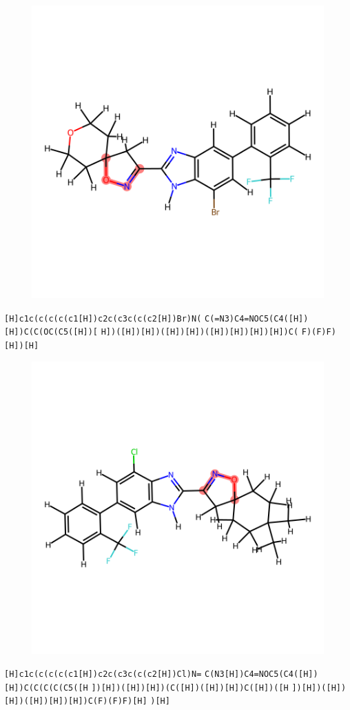 \documentclass{article}
\begin{document}
\begin{figure}[ht]
\centering
    \includegraphics{mol106.png}
\end{figure}
\verb|[H]c1c(c(c(c(c1[H])c2c(c3c(c(c2[H])Br)N(| \verb|C(=N3)C4=NOC5(C4([H])[H])C(C(OC(C5([H])[| \verb|H])([H])[H])([H])[H])([H])[H])[H])[H])C(| \verb|F)(F)F)[H])[H]|

\begin{figure}[ht]
\centering
    \includegraphics{mol107.png}
\end{figure}
\verb|[H]c1c(c(c(c(c1[H])c2c(c3c(c(c2[H])Cl)N=| \verb|C(N3[H])C4=NOC5(C4([H])[H])C(C(C(C(C5([H| \verb|])[H])([H])[H])(C([H])([H])[H])C([H])([H| \verb|])[H])([H])[H])([H])[H])[H])C(F)(F)F)[H]| \verb|)[H]|
\end{document}
